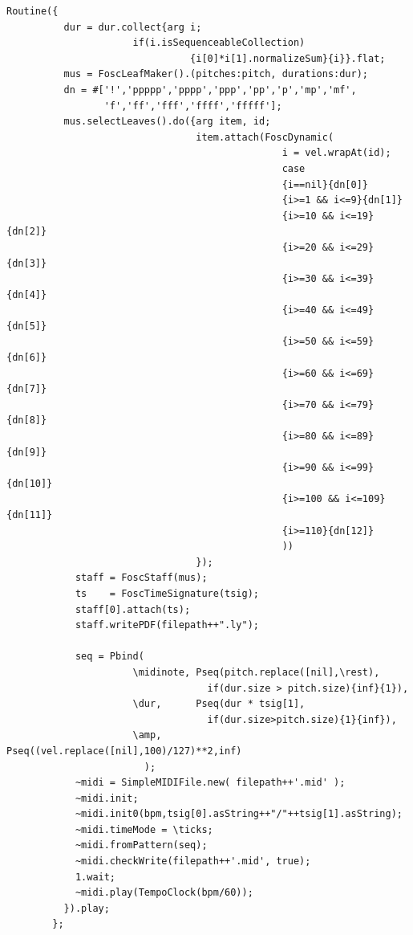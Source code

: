 \begin{enumerate}
\begin{lstlisting}[frame=single]
          Routine({        
          dur = dur.collect{arg i;
                      if(i.isSequenceableCollection)
                                {i[0]*i[1].normalizeSum}{i}}.flat;  
          mus = FoscLeafMaker().(pitches:pitch, durations:dur);
          dn = #['!','ppppp','pppp','ppp','pp','p','mp','mf',
                 'f','ff','fff','ffff','fffff'];
          mus.selectLeaves().do({arg item, id; 
                                 item.attach(FoscDynamic(
                                                i = vel.wrapAt(id);
                                                case
                                                {i==nil}{dn[0]}
                                                {i>=1 && i<=9}{dn[1]}
                                                {i>=10 && i<=19}{dn[2]}
                                                {i>=20 && i<=29}{dn[3]}
                                                {i>=30 && i<=39}{dn[4]}
                                                {i>=40 && i<=49}{dn[5]}
                                                {i>=50 && i<=59}{dn[6]}
                                                {i>=60 && i<=69}{dn[7]}
                                                {i>=70 && i<=79}{dn[8]}
                                                {i>=80 && i<=89}{dn[9]}
                                                {i>=90 && i<=99}{dn[10]}
                                                {i>=100 && i<=109}{dn[11]}
                                                {i>=110}{dn[12]} 
                                                )) 
                                 });
            staff = FoscStaff(mus);
            ts    = FoscTimeSignature(tsig);
            staff[0].attach(ts);
            staff.writePDF(filepath++".ly");
            
            seq = Pbind(
                      \midinote, Pseq(pitch.replace([nil],\rest),
                                   if(dur.size > pitch.size){inf}{1}),
                      \dur,      Pseq(dur * tsig[1],
                                   if(dur.size>pitch.size){1}{inf}),
                      \amp,      Pseq((vel.replace([nil],100)/127)**2,inf)
                        );
            ~midi = SimpleMIDIFile.new( filepath++'.mid' ); 
            ~midi.init;                  
            ~midi.init0(bpm,tsig[0].asString++"/"++tsig[1].asString);
            ~midi.timeMode = \ticks;   
            ~midi.fromPattern(seq);
            ~midi.checkWrite(filepath++'.mid', true);   
            1.wait;
            ~midi.play(TempoClock(bpm/60));
          }).play;
        };
\end{lstlisting}


\end{enumerate}

